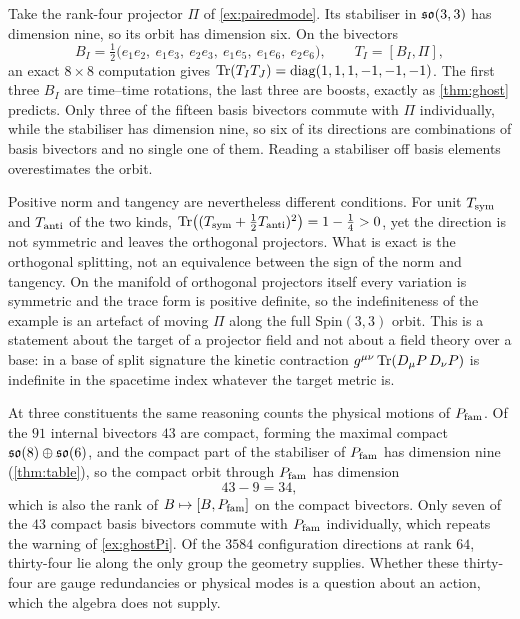 \begin{example}
\label{ex:ghostPi}
Take the rank-four projector $\Pi$ of \cref{ex:pairedmode}. Its stabiliser in $\mathfrak{so}(3,3)$ has dimension nine, so its orbit has
dimension six. On the bivectors
\[
B_I=\tfrac12\bigl(e_1e_2,\ e_1e_3,\ e_2e_3,\ e_1e_5,\ e_1e_6,\ e_2e_6\bigr),\qquad T_I=[B_I,\Pi],
\]
an exact $8\times8$ computation gives $\operatorname{Tr}(T_IT_J)=\operatorname{diag}(1,1,1,-1,-1,-1)$. The first three $B_I$ are time--time rotations,
the last three are boosts, exactly as \cref{thm:ghost} predicts. Only three of the fifteen basis bivectors commute with $\Pi$
individually, while the stabiliser has dimension nine, so six of its directions are combinations of basis bivectors and no single
one of them. Reading a stabiliser off basis elements overestimates the orbit.
\end{example}

Positive norm and tangency are nevertheless different conditions. For unit $T_{\rm sym}$ and $T_{\rm anti}$ of the two kinds,
$\operatorname{Tr}\bigl((T_{\rm sym}+\tfrac12T_{\rm anti})^2\bigr)=1-\tfrac14>0$, yet the direction is not symmetric and leaves the orthogonal
projectors. What is exact is the orthogonal splitting, not an equivalence between the sign of the norm and tangency. On the manifold
of orthogonal projectors itself every variation is symmetric and the trace form is positive definite, so the indefiniteness of the
example is an artefact of moving $\Pi$ along the full $\mathrm{Spin}(3,3)$ orbit. This is a statement about the target of a
projector field and not about a field theory over a base: in a base of split signature the kinetic contraction
$g^{\mu\nu}\operatorname{Tr}(D_\mu P\,D_\nu P)$ is indefinite in the spacetime index whatever the target metric is.

At three constituents the same reasoning counts the physical motions of $P_{\rm fam}$. Of the $91$ internal bivectors $43$ are compact,
forming the maximal compact $\mathfrak{so}(8)\oplus\mathfrak{so}(6)$, and the compact part of the stabiliser of $P_{\rm fam}$ has dimension nine
(\cref{thm:table}), so the compact orbit through $P_{\rm fam}$ has dimension
\[
43-9=34 ,
\]
which is also the rank of $B\mapsto[B,P_{\rm fam}]$ on the compact bivectors. Only seven of the $43$ compact basis bivectors commute with
$P_{\rm fam}$ individually, which repeats the warning of \cref{ex:ghostPi}. Of the $3584$ configuration directions at rank $64$,
thirty-four lie along the only group the geometry supplies. Whether these thirty-four are gauge redundancies or physical modes is a
question about an action, which the algebra does not supply.

